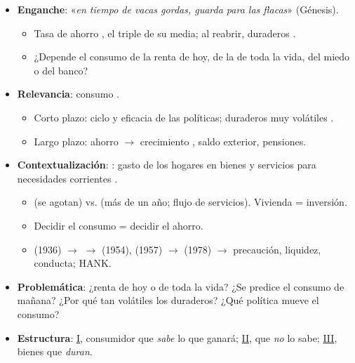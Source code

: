 \documentclass{article}
\begin{document}
\cabecerarepaso
\begin{columnas}

\begin{itemize}
\item \textbf{Enganche}: «\emph{en tiempo de vacas gordas, guarda para las flacas}» (Génesis).
  \begin{itemize}
  \item Tasa de ahorro , el triple de su media; al reabrir, duraderos .
  \item ¿Depende el consumo de la renta de hoy, de la de toda la vida, del miedo o del banco?
  \end{itemize}
\item \textbf{Relevancia}: consumo .
  \begin{itemize}
  \item Corto plazo: ciclo y eficacia de las políticas; duraderos muy volátiles .
  \item Largo plazo: ahorro $\to$ crecimiento , saldo exterior, pensiones.
  \end{itemize}
\item \textbf{Contextualización}: : gasto de los hogares en bienes y servicios para necesidades corrientes .
  \begin{itemize}
  \item {} (se agotan) vs.  (más de un año; flujo de servicios). Vivienda = inversión.
  \item Decidir el consumo = decidir el ahorro.
  \item {} (1936) $\to$  $\to$  (1954),  (1957) $\to$  (1978) $\to$ precaución, liquidez, conducta; HANK.
  \end{itemize}
\item \textbf{Problemática}: ¿renta de hoy o de toda la vida? ¿Se predice el consumo de mañana? ¿Por qué tan volátiles los duraderos? ¿Qué política mueve el consumo?
\item \textbf{Estructura}: \hyperref[rep:I]{I}, consumidor que \emph{sabe} lo que ganará; \hyperref[rep:II]{II}, que \emph{no} lo sabe; \hyperref[rep:III]{III}, bienes que \emph{duran}.
\end{itemize}


\end{columnas}
\end{document}
